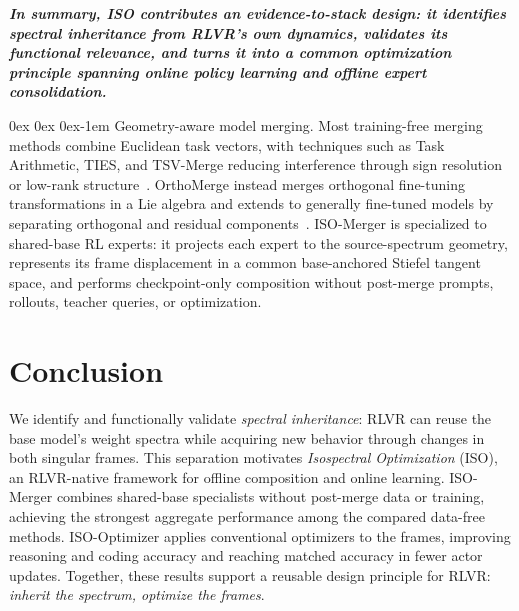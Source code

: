 \documentclass[11pt, a4paper]{utda}
\makeatletter
\renewcommand{\paragraph}{%
  \@startsection{paragraph}{4}%
  {\z@}{0ex \@plus 0ex \@minus 0ex}{-1em}%
  {\normalfont\normalsize\bfseries}%
}
\theoremstyle{plain}
\theoremstyle{definition}
\theoremstyle{remark}
\makeatother
\begin{document}
\textit{\textbf{In summary, ISO contributes an evidence-to-stack design:
it identifies spectral inheritance from RLVR's own dynamics, validates its
functional relevance, and turns it into a common optimization principle
spanning online policy learning and offline expert consolidation.}}


\paragraph{Geometry-aware model merging.}
Most training-free merging methods combine Euclidean task vectors, with
techniques such as Task Arithmetic, TIES, and TSV-Merge reducing interference
through sign resolution or low-rank
structure~\cite{ta,ties,tsv}.
OrthoMerge instead merges orthogonal fine-tuning transformations in a Lie
algebra and extends to generally fine-tuned models by separating orthogonal
and residual components~\cite{yang2026orthogonal}.
ISO-Merger is specialized to shared-base RL experts: it projects each expert
to the source-spectrum geometry, represents its frame displacement in a common
base-anchored Stiefel tangent space, and performs checkpoint-only composition
without post-merge prompts, rollouts, teacher queries, or optimization.
\vspace{-1em}
\section{Conclusion}
\label{sec:conclusion}
\vspace{-1em}
We identify and functionally validate \emph{spectral inheritance}:
RLVR can reuse the base model's weight spectra while acquiring
new behavior through changes in both singular frames.
This separation motivates \emph{Isospectral Optimization} (ISO),
an RLVR-native framework for offline composition and online learning.
ISO-Merger combines shared-base specialists without post-merge
data or training, achieving the strongest aggregate performance
among the compared data-free methods.
ISO-Optimizer applies conventional optimizers to the frames,
improving reasoning and coding accuracy and reaching matched
accuracy in fewer actor updates.
Together, these results support a reusable design principle
for RLVR: \emph{inherit the spectrum, optimize the frames}.




% 
% 
% 
% 


\end{document}
